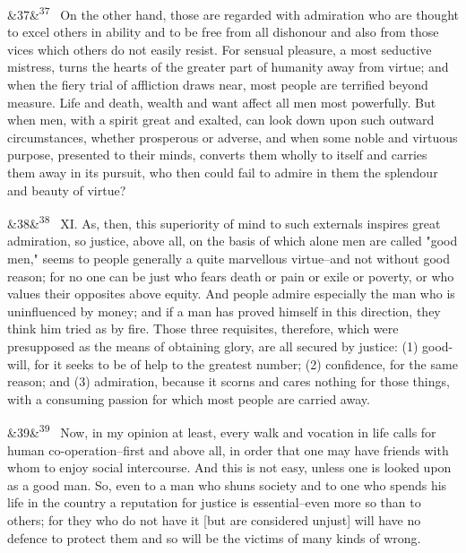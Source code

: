 \documentclass[12pt]{article}
\newcommand{\para}[1][]{\par\noindent\ifx&#1&\else\textsuperscript{\footnotesize #1}~\fi}
\begin{document}
\para[37] On the other hand, those are regarded with admiration who are thought to excel others in ability and to be free from all dishonour and also from those vices which others do not easily resist. For sensual pleasure, a most seductive mistress, turns the hearts of the greater part of humanity away from virtue; and when the fiery trial of affliction draws near, most people are terrified beyond measure. Life and death, wealth and want affect all men most powerfully. But when men, with a spirit great and exalted, can look down upon such outward circumstances, whether prosperous or adverse, and when some noble and virtuous purpose, presented to their minds, converts them wholly to itself and carries them away in its pursuit, who then could fail to admire in them the splendour and beauty of virtue?

\para[38] XI. As, then, this superiority of mind to such externals inspires great admiration, so justice, above all, on the basis of which alone men are called "good men," seems to people generally a quite marvellous virtue--and not without good reason; for no one can be just who fears death or pain or exile or poverty, or who values their opposites above equity. And people admire especially the man who is uninfluenced by money; and if a man has proved himself in this direction, they think him tried as by fire. Those three requisites, therefore, which were presupposed as the means of obtaining glory, are all secured by justice: (1) good-will, for it seeks to be of help to the greatest number; (2) confidence, for the same reason; and (3) admiration, because it scorns and cares nothing for those things, with a consuming passion for which most people are carried away.

\para[39] Now, in my opinion at least, every walk and vocation in life calls for human co-operation--first and above all, in order that one may have friends with whom to enjoy social intercourse. And this is not easy, unless one is looked upon as a good man. So, even to a man who shuns society and to one who spends his life in the country a reputation for justice is essential--even more so than to others; for they who do not have it [but are considered unjust] will have no defence to protect them and so will be the victims of many kinds of wrong.
\end{document}
